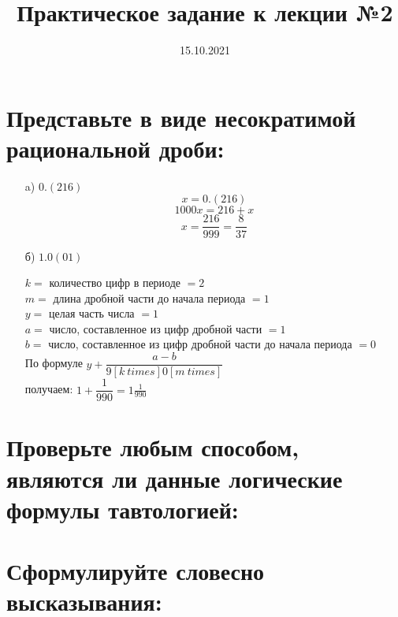 \documentclass[10pt,a4paper]{article}
\title{Практическое задание к лекции №2}
\date{15.10.2021}
\begin{document}
\maketitle

\section{Представьте в виде несократимой рациональной дроби:}
\begin{enumerate}
\item[a)] $0.(216)$
$$x = 0.(216)$$
$$1000x = 216 + x$$
$$x=\frac{216}{999} = \boxed{\frac{8}{37}}$$


\item[б)] $1.0(01)$ \\
\begin{center}
$k=$ количество цифр в периоде $= 2$ \\
$m=$ длина дробной части до начала периода $= 1$ \\
$y=$ целая часть числа $= 1$ \\
$a=$ число, составленное из цифр дробной части $= 1$ \\
$b=$ число, составленное из цифр дробной части до начала периода $= 0$ \\

По формуле $y + \dfrac{a-b}{9[k \: times]0[m \: times]}$ \\
получаем: $1 + \dfrac{1}{990}= \boxed{1\frac{1}{990}}$


\end{center}

\end{enumerate}

\section{Проверьте любым способом, являются ли данные логические формулы
тавтологией:}

\section{Сформулируйте словесно высказывания:}
\end{document}
